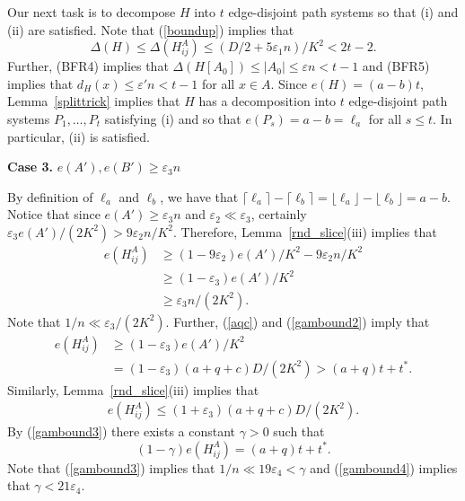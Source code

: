 \documentclass{memo-l}
\def\COMMENT#1{}
\def\eps{\varepsilon}
\numberwithin{section}{chapter}
\numberwithin{equation}{section}
\numberwithin{firstthm}{section}
\numberwithin{figure}{section}
\begin{document}
{Our next task is to decompose $H$ into $t$ edge-disjoint path systems so that (i) and (ii) 
are satisfied. Note that (\ref{boundup}) implies that
$$\Delta (H) \leq \Delta (H^A _{ij}) \leq (D/2+5 \eps _1 n)/K^2 <2t-2.$$
Further, (BFR4) implies that $\Delta (H[A_0]) \leq |A_0| \leq \eps n < t-1$ and 
(BFR5) implies that $d_H (x ) \leq \eps ' n <t-1$ for all $x \in A$. 
Since $e(H)=(a-b)t$,  Lemma~\ref{splittrick} implies that $H$ has a decomposition into $t$ edge-disjoint path systems $P_1,\dots,P_{t}$ satisfying (i) and so that $e(P_s)=a-b=\ell _a$ for all
$ s\leq t$. In particular, (ii) is satisfied.

\medskip

\noindent
{\bf Case 3.} $e(A'), e(B') \geq \eps _3 n$ 

By definition of $\ell _a $ and $\ell _b$, we have that
$\lceil \ell _a \rceil -\lceil \ell _b \rceil= \lfloor \ell _a \rfloor -\lfloor \ell _b \rfloor =a-b$.
Notice that since $e(A') \geq \eps _3 n$ and $\eps _2 \ll \eps _3$, certainly $\eps _3 e(A')/(2K^2) > 9 \eps _2 n/K^2$.
Therefore, Lemma~\ref{rnd_slice}(iii) implies that 
\begin{align}
\nonumber
e (H^A _{ij})& \geq (1-9 \eps _2) {e(A')}/{K^2}-9 \eps _2 n /K^2 \\ & \geq 
(1- \eps _3) e(A')/K^2 \label{gambound2} \\ 
& \geq \eps _3 n/(2K^2). \nonumber
\end{align}
Note that $1/n \ll \eps _3/(2K^2)$.\COMMENT{split calculation up into 2 parts here since it is important to show that
there are many edges in $H^A_{ij}$ so that we can apply Lemma~\ref{simple}.}
Further, (\ref{aqc}) and (\ref{gambound2}) imply that
\begin{align}
\nonumber
e (H^A _{ij})& \geq 
(1- \eps _3) e(A')/K^2  \\ 
& = (1- \eps _3) (a+q+c)D/(2K^2) > (a+q)t+t^* \label{gambound3} . 
\end{align}
Similarly, Lemma~\ref{rnd_slice}(iii) implies that 
\begin{align}\label{gambound4}
e (H^A _{ij}) \leq (1+\eps _3) (a+q+c) D/(2K^2).
\end{align}
By (\ref{gambound3}) there exists a constant $\gamma >0$ such that
$$(1-\gamma)e (H^A _{ij}) =(a+q)t+t^*.$$
Note that  (\ref{gambound3}) implies that $1/n \ll 19 \eps _4 < \gamma$ and (\ref{gambound4}) implies that $\gamma < 21 \eps _4$.%
\COMMENT{the upper bound is not completely obvious this time around since $t^*$ is a `floor': Indeed, since $e(A') \geq \eps _3n$,
(\ref{gambound4}) implies that $(a+q+c)D/2K^2 \geq \eps _3 n/K^2$. Thus,
}}
\end{document}
